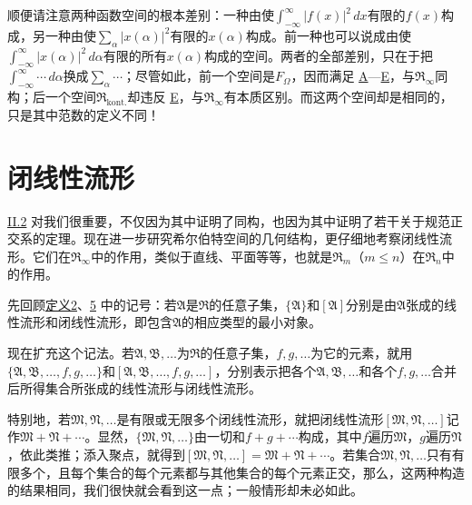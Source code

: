 \documentclass[fontsize=13pt,twoside,openany,headings=normal,parskip=false,bookmarkpackage=false,DIV=calc]{scrbook}
\begin{document}
顺便请注意两种函数空间的根本差别：一种由使$\int_{-\infty}^{\infty}|f(x)|^2\,dx$有限的$f(x)$构成，另一种由使$\sum_\alpha|x(\alpha)|^2$有限的$x(\alpha)$构成。前一种也可以说成由使$\int_{-\infty}^{\infty}|x(\alpha)|^2\,d\alpha$有限的所有$x(\alpha)$构成的空间。两者的全部差别，只在于把$\int_{-\infty}^{\infty}\cdots\,d\alpha$换成$\sum_\alpha\cdots$；尽管如此，前一个空间是$F_\Omega$，因而满足 \hyperref[ax:II.A]{A}—\hyperref[ax:II.E]{E}，与$\mathfrak{R}_\infty$同构；后一个空间$\mathfrak{R}_{\mathrm{kont.}}$却违反 \hyperref[ax:II.E]{E}，与$\mathfrak{R}_\infty$有本质区别。而这两个空间却是相同的，只是其中范数的定义不同！

\section{闭线性流形}\label{sec:II.4}
\hyperref[sec:II.2]{II.2} 对我们很重要，不仅因为其中证明了同构，也因为其中证明了若干关于规范正交系的定理。现在进一步研究希尔伯特空间的几何结构，更仔细地考察闭线性流形。它们在$\mathfrak{R}_\infty$中的作用，类似于直线、平面等等，也就是$\mathfrak{R}_m$（$m\leq n$）在$\mathfrak{R}_n$中的作用。

先回顾\CJKglue \hyperref[def:II.2]{定义2}、\hyperref[def:II.5]{5} 中的记号：若$\mathfrak{A}$是$\mathfrak{R}$的任意子集，$\{\mathfrak{A}\}$和$[\mathfrak{A}]$分别是由$\mathfrak{A}$张成的线性流形和闭线性流形，即包含$\mathfrak{A}$的相应类型的最小对象。

\hypertarget{origpage-39}{}\label{origpage-39}现在扩充这个记法。若$\mathfrak{A},\allowbreak \mathfrak{B},\allowbreak \ldots$为$\mathfrak{R}$的任意子集，$f,\allowbreak g,\allowbreak \ldots$为它的元素，就用$\{\mathfrak{A},\allowbreak \mathfrak{B},\allowbreak \ldots,\allowbreak f,\allowbreak g,\allowbreak \ldots\}$和$[\mathfrak{A},\allowbreak \mathfrak{B},\allowbreak \ldots,\allowbreak f,\allowbreak g,\allowbreak \ldots]$，分别表示把各个$\mathfrak{A},\allowbreak \mathfrak{B},\allowbreak \ldots$和各个$f,\allowbreak g,\allowbreak \ldots$合并后所得集合所张成的线性流形与闭线性流形。

特别地，若$\mathfrak{M},\allowbreak \mathfrak{N},\allowbreak \ldots$是有限或无限多个闭线性流形，就把闭线性流形$[\mathfrak{M},\allowbreak \mathfrak{N},\allowbreak \ldots]$记作$\mathfrak{M}+\mathfrak{N}+\cdots$。显然，$\{\mathfrak{M},\allowbreak \mathfrak{N},\allowbreak \ldots\}$由一切和$f+g+\cdots$构成，其中$f$遍历$\mathfrak{M}$，$g$遍历$\mathfrak{N}$，依此类推；添入聚点，就得到$[\mathfrak{M},\allowbreak \mathfrak{N},\allowbreak \ldots]=\mathfrak{M}+\mathfrak{N}+\cdots$。若集合$\mathfrak{M},\allowbreak \mathfrak{N},\allowbreak \ldots$只有有限多个，且每个集合的每个元素都与其他集合的每个元素正交，那么，这两种构造的结果相同，我们很快就会看到这一点；一般情形却未必如此。
\end{document}
